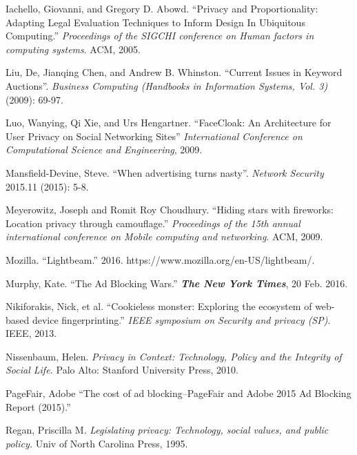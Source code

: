 \documentclass[conference]{IEEEtran}
\begin{document}
\begin{thebibliography}{99}
 Iachello, Giovanni, and Gregory D. Abowd. “Privacy and Proportionality: Adapting Legal Evaluation Techniques to Inform Design In Ubiquitous Computing.” \textit{Proceedings of the SIGCHI conference on Human factors in computing systems}. ACM, 2005.

 Liu, De, Jianqing Chen, and Andrew B. Whinston. “Current Issues in Keyword Auctions”. \textit{Business Computing (Handbooks in Information Systems, Vol. 3)} (2009): 69-97.

 Luo, Wanying, Qi Xie, and Urs Hengartner. “FaceCloak: An Architecture for User Privacy on Social Networking Sites” \textit{International Conference on Computational Science and Engineering}, 2009.

 Mansfield-Devine, Steve. “When advertising turns nasty”. \textit{Network Security} 2015.11 (2015): 5-8.

 Meyerowitz, Joseph and Romit Roy Choudhury. “Hiding stars with fireworks: Location privacy through camouflage.” \textit{Proceedings of the 15th annual international conference on Mobile computing and networking}. ACM, 2009.

 Mozilla. “Lightbeam.” 2016. https://www.mozilla.org/en-US/lightbeam/.

 Murphy, Kate. “The Ad Blocking Wars.” \textbf{\textit{The New York Times}}, 20 Feb. 2016.

 Nikiforakis, Nick, et al. “Cookieless monster: Exploring the ecosystem of web-based device fingerprinting.” \textit{IEEE symposium on Security and privacy (SP)}. IEEE, 2013.

 Nissenbaum, Helen. \textit{Privacy in Context: Technology, Policy and the Integrity of Social Life.} Palo Alto: Stanford University Press, 2010.

 PageFair, Adobe “The cost of ad blocking–PageFair and Adobe 2015 Ad Blocking Report (2015).”


 Regan, Priscilla M. \textit{Legislating privacy: Technology, social values, and public policy.} Univ of North Carolina Press, 1995.


\end{thebibliography}
\end{document}
